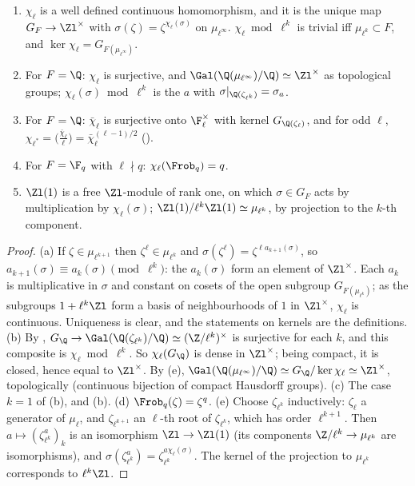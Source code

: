 \begin{proposition}\label{prop:galois:cyclotomic-character}
\begin{enumerate}[label=(\alph*)]
\item $\chi_\ell$ is a well defined continuous homomorphism, and it is the unique map $G_F\to\Zl^\times$ with $\sigma(\zeta)=\zeta^{\chi_\ell(\sigma)}$ on $\mu_{\ell^\infty}$.
$\chi_\ell\bmod\ell^k$ is trivial iff $\mu_{\ell^k}\subset F$, and $\ker\chi_\ell=G_{F(\mu_{\ell^\infty})}$.
\item For $F=\Q$: $\chi_\ell$ is surjective, and $\Gal(\Q(\mu_{\ell^\infty})/\Q)\simeq\Zl^\times$ as topological groups; $\chi_\ell(\sigma)\bmod\ell^k$ is the $a$ with
$\sigma|_{\Q(\zeta_{\ell^k})}=\sigma_a$.
\item For $F=\Q$: $\bar\chi_\ell$ is surjective onto $\F_\ell^\times$ with kernel $G_{\Q(\zeta_\ell)}$, and for odd $\ell$, $\chi_{\ell^*}=\bigl(\frac{\bar\chi_\ell}{\ell}\bigr)=
\bar\chi_\ell^{(\ell-1)/2}$ ().
\item For $F=\F_q$ with $\ell\nmid q$: $\chi_\ell(\Frob_q)=q$.
\item $\Zl(1)$ is a free $\Zl$-module of rank one, on which $\sigma\in G_F$ acts by multiplication by $\chi_\ell(\sigma)$; $\Zl(1)/\ell^k\Zl(1)\simeq\mu_{\ell^k}$, by projection to
the $k$-th component.
\end{enumerate}
\end{proposition}

\begin{proof}
(a) If $\zeta\in\mu_{\ell^{k+1}}$ then $\zeta^\ell\in\mu_{\ell^k}$ and $\sigma(\zeta^\ell)=\zeta^{\ell a_{k+1}(\sigma)}$, so $a_{k+1}(\sigma)\equiv a_k(\sigma)\pmod{\ell^k}$: the
$a_k(\sigma)$ form an element of $\Zl^\times$. Each $a_k$ is multiplicative in $\sigma$ and constant on cosets of the open subgroup $G_{F(\mu_{\ell^k})}$; as the
subgroups $1+\ell^k\Zl$ form a basis of neighbourhoods of $1$ in $\Zl^\times$, $\chi_\ell$ is continuous. Uniqueness is clear, and the statements on kernels are the
definitions.
(b) By , $G_\Q\to\Gal(\Q(\zeta_{\ell^k})/\Q)\simeq(\Z/\ell^k)^\times$ is surjective for each $k$, and this composite is $\chi_\ell\bmod\ell^k$.
So $\chi_\ell(G_\Q)$ is dense in $\Zl^\times$; being compact, it is closed, hence equal to $\Zl^\times$. By (e), $\Gal(\Q(\mu_{\ell^\infty})/\Q)\simeq
G_\Q/\ker\chi_\ell\simeq\Zl^\times$, topologically (continuous bijection of compact Hausdorff groups).
(c) The case $k=1$ of (b), and (b).
(d) $\Frob_q(\zeta)=\zeta^q$.
(e) Choose $\zeta_{\ell^k}$ inductively: $\zeta_\ell$ a generator of $\mu_\ell$, and $\zeta_{\ell^{k+1}}$ an $\ell$-th root of $\zeta_{\ell^k}$, which has order $\ell^{k+1}$. Then
$a\mapsto(\zeta_{\ell^k}^{a})_k$ is an isomorphism $\Zl\to\Zl(1)$ (its components $\Z/\ell^k\to\mu_{\ell^k}$ are isomorphisms), and $\sigma(\zeta_{\ell^k}^{a})=
\zeta_{\ell^k}^{a\chi_\ell(\sigma)}$. The kernel of the projection to $\mu_{\ell^k}$ corresponds to $\ell^k\Zl$.
\end{proof}

